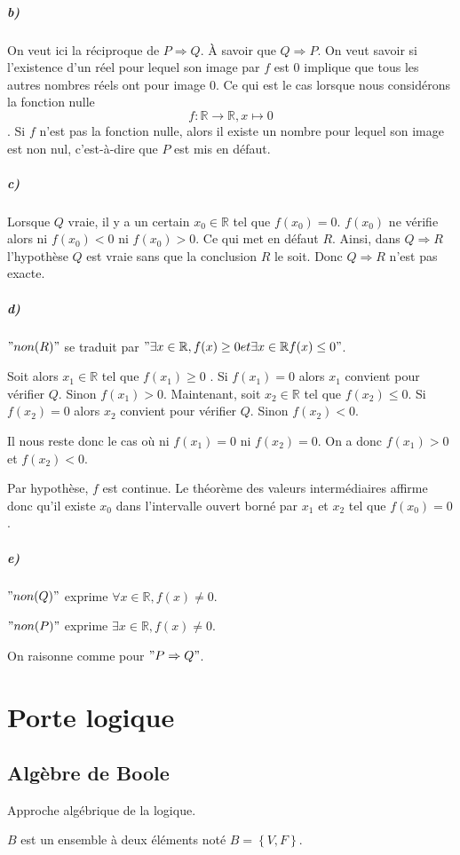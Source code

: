 \documentclass[10pt,a4paper]{article}
\begin{document}
\subparagraph{b)}
On veut ici la réciproque de $P\Rightarrow Q$. \`A savoir que $Q\Rightarrow P$.
On veut savoir si l'existence d'un réel pour lequel son image par $f$ est $0$ implique que tous les autres nombres réels ont pour image $0$.
Ce qui est le cas lorsque nous considérons la fonction nulle
$$f:\mathbb{R}\rightarrow \mathbb{R}, x\mapsto 0$$.
Si $f$ n'est pas la fonction nulle, alors il existe un nombre pour lequel son image est non nul, c'est-à-dire que $P$ est mis en défaut.

\subparagraph{c)}
Lorsque $Q$ vraie, il y a un certain $x_0\in\mathbb{R}$ tel que $f(x_0)=0$. $f(x_0)$ ne vérifie alors ni $f(x_0)<0$ ni $f(x_0)>0$. Ce qui met en défaut $R$. Ainsi, dans $Q\Rightarrow R$ l'hypothèse $Q$ est vraie sans que la conclusion $R$ le soit. Donc $Q\Rightarrow R$ n'est pas exacte.

\subparagraph{d)}
$"non(R)"$ se traduit par $"\exists x \in \mathbb{R} , f(x) \geq 0 et \exists x\in \mathbb{R} f(x) \leq 0"$.

Soit alors $x_1 \in \mathbb{R}$ tel que $f(x_1)\geq 0$ . Si $f(x_1)=0$ alors $x_1$ convient pour vérifier $Q$. Sinon $f(x_1)>0$. 
Maintenant, soit $x_2\in \mathbb{R}$ tel que $f(x_2)\leq 0$. Si $f(x_2)=0$ alors $x_2$ convient pour vérifier $Q$. Sinon $f(x_2)<0$.

Il nous reste donc le cas où ni $f(x_1)=0$ ni $f(x_2)=0$. On a donc $f(x_1)>0$ et $f(x_2)<0$.

Par hypothèse, $f$ est continue. Le théorème des valeurs intermédiaires affirme donc qu'il existe $x_0$ dans l'intervalle ouvert borné par $x_1$ et $x_2$ tel que $f(x_0)=0$.


\subparagraph{e)}
$"non(Q)"$ exprime $\forall x \in \mathbb{R}, f(x)\neq 0$.

$"non(P)"$ exprime $\exists x \in \mathbb{R}, f(x)\neq 0$.

On raisonne comme pour $"P\Rightarrow Q"$.

\section{Porte logique}

\subsection{Algèbre de Boole}
Approche algébrique de la logique.

$B$ est un ensemble à deux éléments noté $B=\left\lbrace V, F \right\rbrace$.
\end{document}

